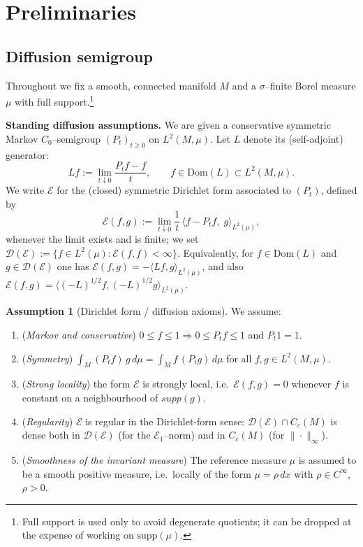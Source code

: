 \documentclass[11pt]{amsart}
\theoremstyle{definition}
\newtheorem{assumption}[theorem]{Assumption}
\theoremstyle{remark}
\newcommand{\supp}{supp}
\begin{document}
\section{Preliminaries}


\subsection{Diffusion semigroup}\label{subsec:diffusion-semigroup}

Throughout we fix a smooth, connected manifold $M$ and a $\sigma$--finite Borel measure $\mu$
with full support.\footnote{Full support is used only to avoid degenerate quotients; it can be
dropped at the expense of working on $\mathrm{supp}(\mu)$.}

\medskip
\noindent\textbf{Standing diffusion assumptions.}
We are given a conservative symmetric Markov $C_0$--semigroup $(P_t)_{t\ge 0}$ on $L^2(M,\mu)$.
Let $L$ denote its (self-adjoint) generator:
\[
Lf := \lim_{t\downarrow 0}\frac{P_tf-f}{t},\qquad f\in \mathrm{Dom}(L)\subset L^2(M,\mu).
\]
We write $\mathcal E$ for the (closed) symmetric Dirichlet form associated to $(P_t)$, defined by
\[
\mathcal{E}(f,g):=\lim_{t\downarrow 0}\frac1t\,\langle f-P_tf,\; g\rangle_{L^2(\mu)},
\]
whenever the limit exists and is finite; we set $\mathcal D(\mathcal E):=\{f\in L^2(\mu):\mathcal E(f,f)<\infty\}$.
Equivalently, for $f\in\mathrm{Dom}(L)$ and $g\in\mathcal D(\mathcal E)$ one has
$\mathcal E(f,g)=-\langle Lf,g\rangle_{L^2(\mu)}$, and also
$\mathcal E(f,g)=\langle(-L)^{1/2}f,(-L)^{1/2}g\rangle_{L^2(\mu)}$.

\begin{assumption}[Dirichlet form / diffusion axioms]\label{ass:D}
We assume:
\begin{enumerate}
\item[(D1)] (\emph{Markov and conservative}) $0\le f\le 1 \Rightarrow 0\le P_tf\le 1$ and $P_t1=1$.
\item[(D2)] (\emph{Symmetry}) $\int_M (P_tf)\,g\,d\mu=\int_M f\,(P_tg)\,d\mu$ for all $f,g\in L^2(M,\mu)$.
\item[(D3)] (\emph{Strong locality}) the form $\mathcal{E}$ is strongly local, i.e.\ $\mathcal{E}(f,g)=0$
whenever $f$ is constant on a neighbourhood of $\supp(g)$.
\item[(D4)] (\emph{Regularity}) $\mathcal{E}$ is regular in the Dirichlet-form sense: $\mathcal{D}(\mathcal{E})\cap C_c(M)$
is dense both in $\mathcal{D}(\mathcal{E})$ (for the $\mathcal{E}_1$--norm) and in $C_c(M)$ (for $\|\cdot\|_\infty$).
\item[(D5)] (\emph{Smoothness of the invariant measure}) The reference measure $\mu$ is assumed to be a smooth positive measure,
i.e.\ locally of the form $\mu=\rho\,dx$ with $\rho\in C^\infty$, $\rho>0$.
\end{enumerate}
\end{assumption}
\end{document}
